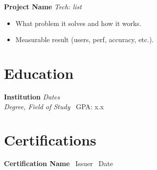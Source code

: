 \documentclass[10pt,letterpaper]{article}
\begin{document}
\textbf{Project Name} \hfill \textit{Tech: list} \\
\begin{itemize}
  \item What problem it solves and how it works.
  \item Measurable result (users, perf, accuracy, etc.).
\end{itemize}

\section*{Education}
\textbf{Institution} \hfill \textit{Dates} \\
\textit{Degree, Field of Study} \textbar\ GPA: x.x

\section*{Certifications}
\textbf{Certification Name} \textbar\ Issuer \textbar\ Date
\end{document}
